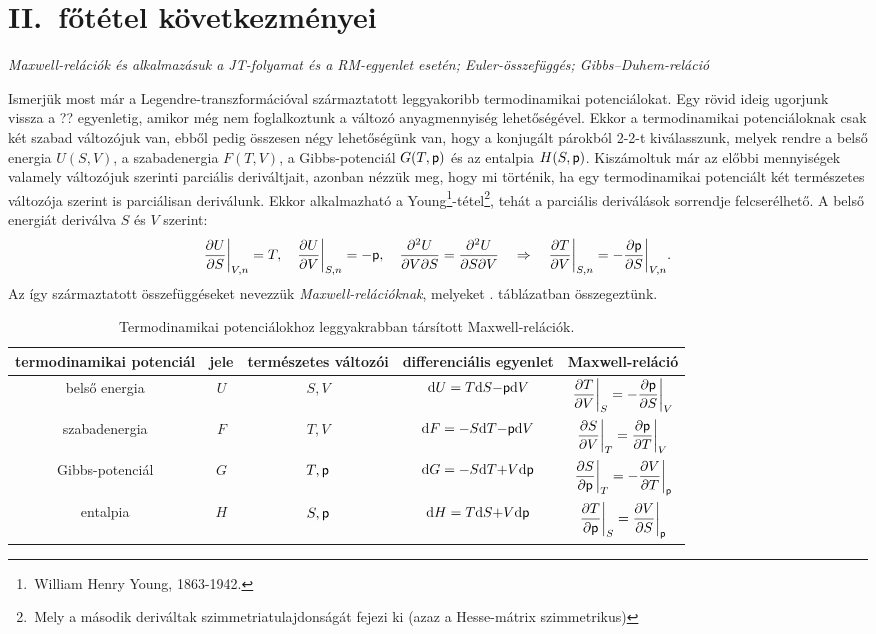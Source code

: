 \section{II.\ főtétel következményei}
\emph{Maxwell-relációk és alkalmazásuk a JT-folyamat és a RM-egyenlet esetén; Euler-összefüggés; Gibbs--Duhem-reláció}

Ismerjük most már a Legendre-transzformációval származtatott leggyakoribb termodinamikai potenciálokat. Egy rövid ideig ugorjunk vissza a ?? %
egyenletig, amikor még nem foglalkoztunk a változó anyagmennyiség lehetőségével. Ekkor a termodinamikai potenciáloknak csak két szabad változójuk van, ebből pedig összesen négy lehetőségünk van, hogy a konjugált párokból 2-2-t kiválasszunk, melyek rendre a belső energia $U(S,V)$, a szabadenergia $F(T,V)$, a Gibbs-potenciál $G(T,\mathsf p)$ és az entalpia $H(S,\mathsf p)$. Kiszámoltuk már az előbbi mennyiségek valamely változójuk szerinti parciális deriváltjait, azonban nézzük meg, hogy mi történik, ha egy termodinamikai potenciált két természetes változója szerint is parciálisan deriválunk. Ekkor alkalmazható a Young\footnote{\,William Henry Young, 1863-1942.}-tétel\footnote{\,Mely a második deriváltak szimmetriatulajdonságát fejezi ki (azaz a Hesse\footnotemark-mátrix szimmetrikus)}, tehát a parciális deriválások sorrendje felcserélhető.
A belső energiát deriválva $S$ és $V$ szerint:
\begin{align}
	\frac{\partial{U}}{\partial{S}}\bigg|_{V,n} = T,\quad \frac{\partial{U}}{\partial{V}}\bigg|_{S,n} = -\mathsf p ,\quad \frac{\partial^2 U}{\partial V\partial S} = \frac{\partial^2 U}{\partial S\partial V} \quad\Rightarrow\quad \frac{\partial{T}}{\partial{V}}\bigg|_{S,n} = - \frac{\partial{\mathsf p}}{\partial{S}}\bigg|_{V,n}.
\end{align}
Az így származtatott összefüggéseket nevezzük \emph{Maxwell-relációknak}, melyeket . táblázatban összegeztünk. 
\begin{table}[h!]
\centering
\begin{adjustbox}{width=1.1\textwidth, center=\textwidth}
\begin{tabular}{|c|c|c|c|c|} \hline
termodinamikai potenciál & jele & természetes változói & differenciális egyenlet & Maxwell-reláció\\ \hline\hline
belső energia & $U$ & $S,V$ & $\mathrm{d}U = T\mathrm{d}S{-}\mathsf p \mathrm{d}V$ & $\dfrac{\partial T}{\partial V}\bigg|_S = -\dfrac{\partial \mathsf p}{\partial S}\bigg|_V$\\ \hline
szabadenergia & $F$ & $T,V$ & $\mathrm{d}F = {-}S\mathrm{d}T{-}\mathsf p\mathrm{d}V$ & $\dfrac{\partial S}{\partial V}\bigg|_T = \dfrac{\partial \mathsf p}{\partial T}\bigg|_V$\\ \hline
Gibbs-potenciál & $G$ & $T,\mathsf p$ & $\mathrm{d}G = {-}S\mathrm{d}T {+}V\mathrm{d}\mathsf p$ & $\dfrac{\partial S}{\partial \mathsf p}\bigg|_T = -\dfrac{\partial V}{\partial T}\bigg|_\mathsf p$\\ \hline
entalpia & $H$ & $S,\mathsf p$ & $\mathrm{d}H = T\mathrm{d}S {+} V\mathrm{d}\mathsf p$ & $\dfrac{\partial T}{\partial \mathsf p}\bigg|_S = \dfrac{\partial V}{\partial S}\bigg|_\mathsf p$\\ \hline
\end{tabular}
\end{adjustbox}
\caption{Termodinamikai potenciálokhoz leggyakrabban társított Maxwell-relációk.}
\label{tab:pot_Maxwell}
\end{table}
